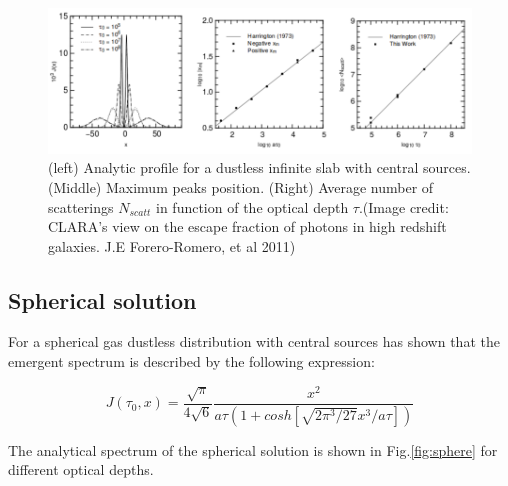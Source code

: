 \begin{figure}[H]
\begin{center}
\includegraphics[scale=0.4]{Figures/slab.png}
\end{center}\caption{(left) Analytic profile for a dustless infinite slab with central
\ly sources. (Middle) Maximum peaks position. (Right) Average number of 
scatterings $N_{scatt}$ in function of the optical depth $\tau$.(Image credit:  CLARA's view on the escape fraction of \ly photons in high redshift galaxies. J.E Forero-Romero, et al 2011)\label{fig:slab}}
\end{figure}

\subsection{Spherical solution}

For a spherical gas dustless distribution with central \ly sources \citep{Dijkstra06} has shown that the emergent spectrum is described by the following expression:

\begin{equation}
J(\tau_0, x) = \dfrac{\sqrt{\pi}}{4\sqrt{6}}\dfrac{x^2}{a\tau (1+cosh[\sqrt{2\pi^3/27}x^3/a\tau])}
\end{equation}

The analytical spectrum of the spherical solution 
is shown in Fig.\ref{fig:sphere} for different optical depths. 

